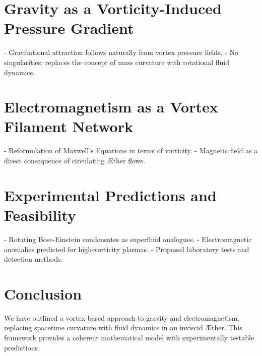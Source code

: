 \documentclass[12pt]{article}
\begin{document}
    \section{Gravity as a Vorticity-Induced Pressure Gradient}
    - Gravitational attraction follows naturally from vortex pressure fields.
    - No singularities; replaces the concept of mass curvature with rotational fluid dynamics.

    \section{Electromagnetism as a Vortex Filament Network}
    - Reformulation of Maxwell’s Equations in terms of vorticity.
    - Magnetic field as a direct consequence of circulating \AE ther flows.

    \section{Experimental Predictions and Feasibility}
    - Rotating Bose-Einstein condensates as superfluid analogues.
    - Electromagnetic anomalies predicted for high-vorticity plasmas.
    - Proposed laboratory tests and detection methods.

    \section{Conclusion}
    We have outlined a vortex-based approach to gravity and electromagnetism, replacing spacetime curvature with fluid dynamics in an inviscid \AE ther. This framework provides a coherent mathematical model with experimentally testable predictions.
\end{document}
